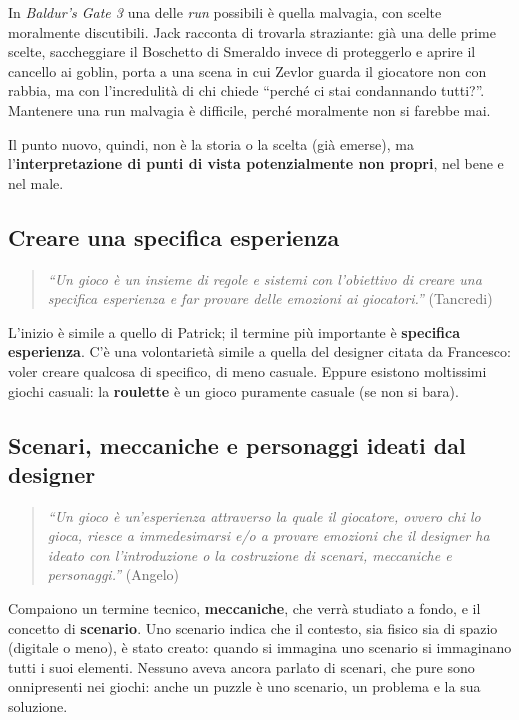 In \emph{Baldur's Gate 3} una delle \emph{run} possibili è quella malvagia,
con scelte moralmente discutibili. Jack racconta di trovarla straziante: già
una delle prime scelte, saccheggiare il Boschetto di Smeraldo invece di
proteggerlo e aprire il cancello ai goblin, porta a una scena in cui Zevlor
guarda il giocatore non con rabbia, ma con l'incredulità di chi chiede ``perché
ci stai condannando tutti?''. Mantenere una run malvagia è difficile, perché
moralmente non si farebbe mai.

Il punto nuovo, quindi, non è la storia o la scelta (già emerse), ma
l'\textbf{interpretazione di punti di vista potenzialmente non propri}, nel
bene e nel male.

\subsection{Creare una specifica esperienza}

\begin{quote}
\emph{``Un gioco è un insieme di regole e sistemi con l'obiettivo di creare una
specifica esperienza e far provare delle emozioni ai giocatori.''} (Tancredi)
\end{quote}

L'inizio è simile a quello di Patrick; il termine più importante è
\textbf{specifica esperienza}. C'è una volontarietà simile a quella del
designer citata da Francesco: voler creare qualcosa di specifico, di meno
casuale. Eppure esistono moltissimi giochi casuali: la \textbf{roulette} è un
gioco puramente casuale (se non si bara).

\subsection{Scenari, meccaniche e personaggi ideati dal designer}

\begin{quote}
\emph{``Un gioco è un'esperienza attraverso la quale il giocatore, ovvero chi
lo gioca, riesce a immedesimarsi e/o a provare emozioni che il designer ha
ideato con l'introduzione o la costruzione di scenari, meccaniche e
personaggi.''} (Angelo)
\end{quote}

Compaiono un termine tecnico, \textbf{meccaniche}, che verrà studiato a
fondo, e il concetto di \textbf{scenario}. Uno scenario indica che il
contesto, sia fisico sia di spazio (digitale o meno), è stato creato: quando si
immagina uno scenario si immaginano tutti i suoi elementi. Nessuno aveva
ancora parlato di scenari, che pure sono onnipresenti nei giochi: anche un
puzzle è uno scenario, un problema e la sua soluzione.

